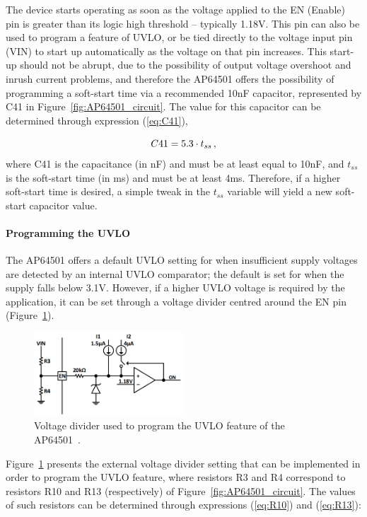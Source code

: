 The device starts operating as soon as the voltage applied to the EN (Enable) pin is greater than its logic high threshold -- typically 1.18V. This pin can also be used to program a feature of \gls{UVLO}, or be tied directly to the voltage input pin (VIN) to start up automatically as the voltage on that pin increases. This start-up should not be abrupt, due to the possibility of output voltage overshoot and inrush current problems, and therefore the AP64501 offers the possibility of programming a soft-start time via a recommended 10nF capacitor, represented by C41 in Figure~\ref{fig:AP64501_circuit}. The value for this capacitor can be determined through expression (\ref{eq:C41}),

\begin{equation}\label{eq:C41}
	C41 = 5.3 \cdot t_{ss}\,,\medskip
\end{equation}
where C41 is the capacitance (in nF) and must be at least equal to 10nF, and $t_{ss}$ is the soft-start time (in ms) and must be at least 4ms. Therefore, if a higher soft-start time is desired, a simple tweak in the $t_{ss}$ variable will yield a new soft-start capacitor value.

\paragraph{Programming the UVLO}	The AP64501 offers a default UVLO setting for when insufficient supply voltages are detected by an internal UVLO comparator; the default is set for when the supply falls below 3.1V. However, if a higher UVLO voltage is required by the application, it can be set through a voltage divider centred around the EN pin (Figure~\ref{fig:UVLO_divider}).

\begin{figure}[h]
	\centering
	\includegraphics[width=0.5\textwidth]{Chapters/Figures/chapter3/UVLO.png}
	\caption{Voltage divider used to program the UVLO feature of the AP64501~\cite{AP64501}.}
	\label{fig:UVLO_divider}
\end{figure}

Figure~\ref{fig:UVLO_divider} presents the external voltage divider setting that can be implemented in order to program the UVLO feature, where resistors R3 and R4 correspond to resistors R10 and R13 (respectively) of Figure~\ref{fig:AP64501_circuit}. The values of such resistors can be determined through expressions (\ref{eq:R10}) and (\ref{eq:R13}):

